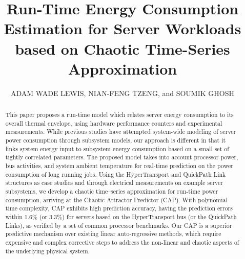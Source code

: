 \documentclass[prodmode,acmtaco,pdftex]{acmsmall}
\begin{document}
\title{Run-Time Energy Consumption
  Estimation for Server Workloads based on Chaotic Time-Series Approximation} 
\author{ADAM WADE LEWIS, NIAN-FENG TZENG, and SOUMIK GHOSH
}
\begin{abstract}
  This paper proposes a run-time model which relates server energy
  consumption to its overall thermal envelope, using hardware
  performance counters and experimental measurements.  While previous
  studies have attempted system-wide modeling of server power
  consumption through subsystem models, our approach is different in
  that it links system energy input to subsystem energy consumption
  based on a small set of tightly correlated parameters.  The proposed
  model takes into account processor power, bus activities, and system
  ambient temperature for real-time prediction on the power consumption
  of long running jobs.  Using the HyperTransport and QuickPath Link
  structures as case studies and through electrical measurements on
  example server subsystems, we develop a chaotic time--series
  approximation for run-time power consumption, arriving at the Chaotic
  Attractor Predictor (CAP).  With polynomial time complexity, CAP
  exhibits high prediction accuracy, having the prediction errors within
  1.6\% (or 3.3\%) for servers based on the HyperTransport bus (or the
  QuickPath Links), as verified by a set of common processor benchmarks.
  Our CAP is a superior predictive mechanism over existing linear
  auto-regressive methods, which require expensive and complex
  corrective steps to address the non-linear and chaotic aspects of the
  underlying physical system.
\end{abstract}
 
\end{document}
